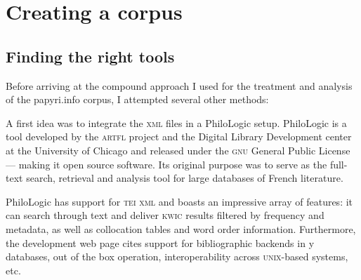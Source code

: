 \chapter{Creating a corpus}
\label{chp:corpuscreation}
\minitoc\mtcskip
\section{Finding the right tools}
Before arriving at the compound approach I used for the treatment and analysis
of the papyri.info corpus, I attempted several other methods:

A first idea was to integrate the \textsc{xml} files in a PhiloLogic setup.
PhiloLogic is a tool developed by the \textsc{artfl} project and the Digital
Library Development center at the University of Chicago and released under the
\textsc{gnu} General Public License --- making it open source software. Its
original purpose was to serve as the full-text search, retrieval and analysis
tool for large databases of French literature.

PhiloLogic has support for \textsc{tei} \textsc{xml} and boasts an impressive
array of features: it can search through text and deliver \textsc{kwic} results
filtered by frequency and metadata, as well as collocation tables and word
order information.  Furthermore, the development web page cites support for
bibliographic backends in y databases, out of the box operation,
interoperability across \textsc{unix}-based systems, etc.

